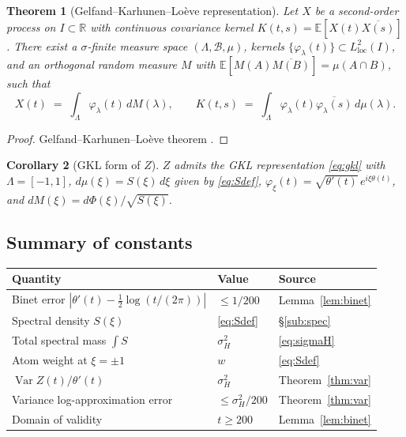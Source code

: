 \documentclass[11pt]{amsart}
\newtheorem{theorem}{Theorem}[section]
\newtheorem{corollary}[theorem]{Corollary}
\theoremstyle{definition}
\DeclareMathOperator{\Var}{Var}
\begin{document}
\begin{theorem}[Gelfand--Karhunen--Lo\`eve representation]\label{thm:GKL}
Let $X$ be a second-order process on $I\subset\mathbb{R}$ with continuous
covariance kernel $K(t,s)=\mathbb{E}[X(t)\overline{X(s)}]$. There exist a
$\sigma$-finite measure space $(\Lambda,\mathcal{B},\mu)$, kernels
$\{\varphi_{\lambda}(t)\}\subset L^{2}_{\mathrm{loc}}(I)$, and an orthogonal
random measure $M$ with $\mathbb{E}[M(A)\overline{M(B)}]=\mu(A\cap B)$, such that
\begin{equation}\label{eq:gkl}
X(t) \;=\; \int_{\Lambda}\varphi_{\lambda}(t)\,dM(\lambda),
\qquad K(t,s) \;=\; \int_{\Lambda}\varphi_{\lambda}(t)\overline{\varphi_{\lambda}(s)}\,d\mu(\lambda).
\end{equation}
\end{theorem}

\begin{proof}
Gelfand--Karhunen--Lo\`eve theorem \cite{Karhunen1947,Loeve1978}.
\end{proof}

\begin{corollary}[GKL form of $Z$]\label{cor:gklZ}
$Z$ admits the GKL representation \eqref{eq:gkl} with $\Lambda=[-1,1]$,
$d\mu(\xi)=S(\xi)\,d\xi$ given by \eqref{eq:Sdef},
$\varphi_{\xi}(t)=\sqrt{\theta'(t)}\,e^{i\xi\theta(t)}$, and
$dM(\xi)=d\Phi(\xi)/\sqrt{S(\xi)}$.
\end{corollary}

\subsection{Summary of constants}

\begin{center}
\begin{tabular}{lll}
\hline
Quantity & Value & Source \\
\hline
Binet error $|\theta'(t)-\tfrac12\log(t/(2\pi))|$ & $\le 1/200$ & Lemma~\ref{lem:binet} \\
Spectral density $S(\xi)$ & \eqref{eq:Sdef} & \S\ref{sub:spec} \\
Total spectral mass $\int S$ & $\sigma_{H}^{2}$ & \eqref{eq:sigmaH} \\
Atom weight at $\xi=\pm 1$ & $w$ & \eqref{eq:Sdef} \\
$\Var Z(t)/\theta'(t)$ & $\sigma_{H}^{2}$ & Theorem~\ref{thm:var} \\
Variance log-approximation error & $\le\sigma_{H}^{2}/200$ & Theorem~\ref{thm:var} \\
Domain of validity & $t\ge 200$ & Lemma~\ref{lem:binet} \\
\hline
\end{tabular}
\end{center}
\end{document}
